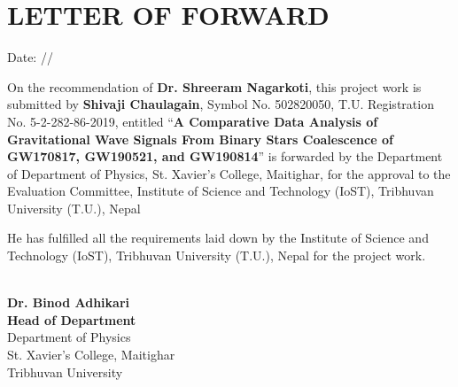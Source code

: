 \chapter*{LETTER OF FORWARD}
Date: \hspace{1.4em}/\hspace{1.5em}/
\vspace{8pt}

\noindent On the recommendation of \textbf{Dr. Shreeram Nagarkoti}, this project work is submitted by \textbf{Shivaji Chaulagain}, Symbol No. 502820050, T.U. Registration No. 5-2-282-86-2019, entitled ``\textbf{A Comparative Data Analysis of Gravitational Wave Signals From Binary Stars Coalescence of GW170817, GW190521, and GW190814}” is
forwarded by the Department of Department of Physics, St. Xavier's College, Maitighar, for the approval to the Evaluation Committee, Institute of Science and Technology (IoST), Tribhuvan University (T.U.), Nepal
\vspace{8pt}

\noindent He has fulfilled all the requirements laid down by the Institute of Science and Technology (IoST), Tribhuvan University (T.U.), Nepal for the project work.


\vspace{70pt}
\begin{flushleft}
	\underline{\hspace{4.1cm}} \\
	\textbf{Dr. Binod Adhikari}\\
	\textbf{Head of Department}\\
	Department of Physics \\
	St. Xavier's College, Maitighar\\
Tribhuvan University
\end{flushleft}
